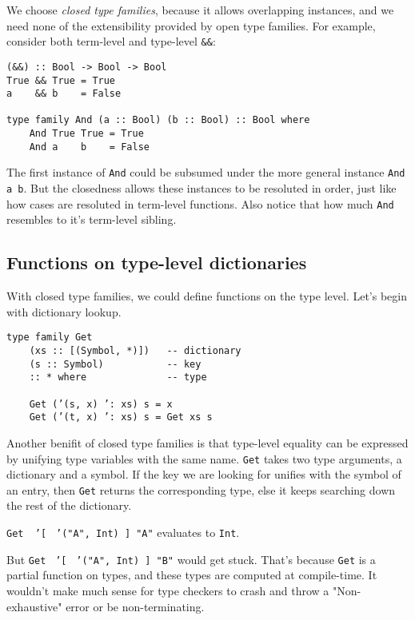 \documentclass[pldi]{sigplanconf-pldi16}
\begin{document}
We choose \emph{closed type families}, because it allows overlapping instances,
and we need none of the extensibility provided by open type families.
For example, consider both term-level and type-level \texttt{&&}:

\begin{verbatim}
(&&) :: Bool -> Bool -> Bool
True && True = True
a    && b    = False

type family And (a :: Bool) (b :: Bool) :: Bool where
    And True True = True
    And a    b    = False
\end{verbatim}

The first instance of \texttt{And} could be subsumed
under the more general instance \texttt{And a b}.
But the closedness allows these instances to be resoluted in order, just like
how cases are resoluted in term-level functions. Also notice that how much
\texttt{And} resembles to it's term-level sibling.

\subsection{Functions on type-level dictionaries}

With closed type families, we could define functions on the type level.
Let's begin with dictionary lookup.

\begin{verbatim}
type family Get
    (xs :: [(Symbol, *)])   -- dictionary
    (s :: Symbol)           -- key
    :: * where              -- type

    Get (’(s, x) ’: xs) s = x
    Get (’(t, x) ’: xs) s = Get xs s
\end{verbatim}

Another benifit of closed type families is that type-level equality can be
expressed by unifying type variables with the same name.
\texttt{Get} takes two type arguments, a dictionary and a symbol.
If the key we are looking for unifies with the symbol of an entry, then
 \texttt{Get} returns the corresponding type, else it keeps
 searching down the rest of the dictionary.

\texttt{Get }\texttt{ '}\texttt{[ }
\texttt{'}\texttt{("A", Int) ] "A"} evaluates to
\texttt{Int}.

But \texttt{Get }
\texttt{'}\texttt{[ }
\texttt{'}\texttt{("A", Int) ] "B"} would get stuck.
That's because \texttt{Get} is a partial function on types,
 and these types are computed at compile-time. It wouldn't make
much sense for type checkers to crash and throw a "Non-exhaustive" error or
be non-terminating.
\end{document}
